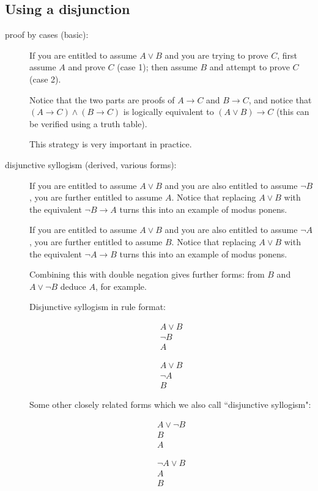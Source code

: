 \documentclass[12pt]{book}
\begin{document}
\subsection{Using a disjunction}

\begin{description}

\item[proof by cases (basic):]  If you are entitled to assume $A \vee B$ and you are trying to prove $C$, first assume $A$ and prove $C$ (case 1);
then assume $B$ and attempt to prove $C$ (case 2).  

Notice that the two parts are proofs of $A \rightarrow C$ and $B \rightarrow C$,
and notice that $(A \rightarrow C) \wedge (B \rightarrow C)$ is logically equivalent to $(A \vee B) \rightarrow C$ (this can be verified using a truth table).

This strategy is very important in practice.


\item[disjunctive syllogism (derived, various forms):]  If you are entitled to assume $A \vee B$ and you are also entitled to assume $\neg B$, you are further entitled to assume $A$.  Notice that replacing $A \vee B$ with the equivalent $\neg B \rightarrow A$ turns this into an example of modus ponens.


If you are entitled to assume $A \vee B$ and you are also entitled to assume $\neg A$, you are further entitled to assume $B$.  Notice that replacing $A \vee B$ with the equivalent $\neg A \rightarrow B$ turns this into an example of modus ponens.

Combining this with double negation gives further forms:  from $B$ and $A \vee \neg B$ deduce $A$, for example.

Disjunctive syllogism in rule format:

$$\begin{array}{r}  A \vee B \\ \neg B \\ \hline A \end{array}$$

$$\begin{array}{r}  A \vee B \\ \neg A \\ \hline B \end{array}$$

Some other closely related forms which we also call ``disjunctive syllogism":

$$\begin{array}{r}  A \vee \neg B \\ B \\ \hline A \end{array}$$

$$\begin{array}{r}  \neg A \vee B \\ A \\ \hline B \end{array}$$

\end{description}
\end{document}
